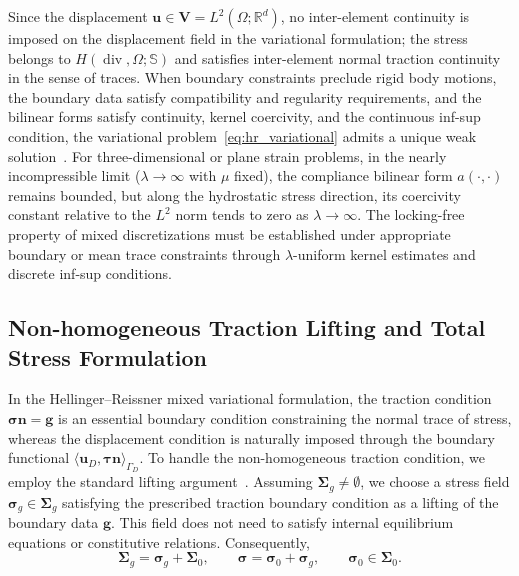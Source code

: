 Since the displacement $\boldsymbol{u} \in \boldsymbol{V} = L^2(\Omega;\mathbb{R}^d)$, no inter-element continuity is imposed on the displacement field in the variational formulation; the stress belongs to $H(\operatorname{div},\Omega;\mathbb{S})$ and satisfies inter-element normal traction continuity in the sense of traces. When boundary constraints preclude rigid body motions, the boundary data satisfy compatibility and regularity requirements, and the bilinear forms satisfy continuity, kernel coercivity, and the continuous inf-sup condition, the variational problem~\eqref{eq:hr_variational} admits a unique weak solution~\cite{BoffiBrezziFortin2013}. For three-dimensional or plane strain problems, in the nearly incompressible limit ($\lambda \to \infty$ with $\mu$ fixed), the compliance bilinear form $a(\cdot,\cdot)$ remains bounded, but along the hydrostatic stress direction, its coercivity constant relative to the $L^2$ norm tends to zero as $\lambda \to \infty$. The locking-free property of mixed discretizations must be established under appropriate boundary or mean trace constraints through $\lambda$-uniform kernel estimates and discrete inf-sup conditions.

\subsection{Non-homogeneous Traction Lifting and Total Stress Formulation}
\label{subsec:traction_lifting}

In the Hellinger--Reissner mixed variational formulation, the traction condition $\boldsymbol{\sigma}\boldsymbol{n} = \boldsymbol{g}$ is an essential boundary condition constraining the normal trace of stress, whereas the displacement condition is naturally imposed through the boundary functional $\langle\boldsymbol{u}_D,\boldsymbol{\tau}\boldsymbol{n}\rangle_{\Gamma_D}$. To handle the non-homogeneous traction condition, we employ the standard lifting argument~\cite{Codina2024}. Assuming $\boldsymbol{\Sigma}_g \ne \emptyset$, we choose a stress field $\boldsymbol{\sigma}_g \in \boldsymbol{\Sigma}_g$ satisfying the prescribed traction boundary condition as a lifting of the boundary data $\boldsymbol{g}$. This field does not need to satisfy internal equilibrium equations or constitutive relations. Consequently,
\begin{equation*}
\boldsymbol{\Sigma}_g = \boldsymbol{\sigma}_g + \boldsymbol{\Sigma}_0, \qquad 
\boldsymbol{\sigma} = \boldsymbol{\sigma}_0 + \boldsymbol{\sigma}_g, \qquad 
\boldsymbol{\sigma}_0 \in \boldsymbol{\Sigma}_0.
\end{equation*}

